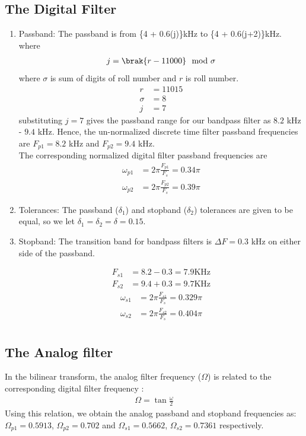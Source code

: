 \documentclass{article}
\begin{document}
\subsection{The Digital Filter}
\begin{enumerate}
\item {Passband:}
The passband is from \{4 + 0.6(j)\}kHz to \{4 + 0.6(j+2)\}kHz. \\
where 
\begin{align}
    j=\brak{r-11000} \mod \sigma
\end{align}
where $\sigma$ is sum of digits of roll number and $r$ is roll number.\\
\begin{align}
    r&=11015\\
    \sigma  &= 8\\
    j&=7
\end{align}
 substituting $j =7$ gives the passband
range for our bandpass filter as $8.2$ kHz - $9.4$ kHz.  Hence, the un-normalized discrete time filter
passband frequencies are $F_{p1} = 8.2$ kHz
and $F_{p2} = 9.4$ kHz. \\
The corresponding normalized digital filter passband frequencies are
\begin{align}
    \omega_{p1} &= 2\pi\frac{F_{p1}}{F_s} = 0.34 \pi\\
    \omega_{p2} &= 2\pi\frac{F_{p2}}{F_s}  =0.39 \pi
\end{align}

\item {Tolerances:}  The passband ($\delta_1$) and stopband ($\delta_2$) tolerances are given to
be equal, so we let $\delta_1 = \delta_2 = \delta = 0.15$.

\item { Stopband:}  The {transition band} for bandpass filters is $\Delta F = 0.3$ kHz on either side of the passband.

\begin{align}
    F_{s1} &= 8.2-0.3 = 7.9 \text{KHz}\\
    F	_{s2} &= 9.4+0.3 = 9.7  \text{KHz}
\end{align}
\begin{align}
    \omega_{s1} &= 2\pi\frac{F_{s1}}{F_s} = 0.329 \pi\\
     \omega_{s2} &= 2\pi\frac{F_{s2}}{F_s} = 0.404 \pi\\
\end{align}
\end{enumerate}
\subsection{The Analog filter}
In the bilinear transform, the analog filter frequency ($\Omega$) is related to the corresponding digital filter frequency\brak{\omega} :
\begin{align}
  \Omega = \tan \frac{\omega}{2}  
\end{align}
Using this relation, we obtain the analog passband and stopband frequencies as:
$\Omega_{p1} = 0.5913$, $\Omega_{p2} = 0.702$ and $\Omega_{s1} = 0.5662$, $\Omega_{s2} = 0.7361$
respectively.
\end{document}
